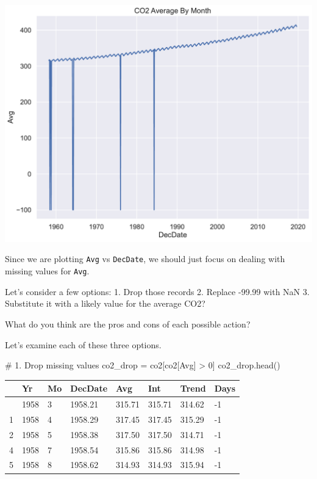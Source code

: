 \documentclass[
  letterpaper,
  DIV=11,
  numbers=noendperiod]{scrreprt}
\newenvironment{Shaded}{\begin{snugshade}}{\end{snugshade}}
\newcommand{\CommentTok}[1]{\textcolor[rgb]{0.37,0.37,0.37}{#1}}
\newcommand{\DecValTok}[1]{\textcolor[rgb]{0.68,0.00,0.00}{#1}}
\newcommand{\NormalTok}[1]{\textcolor[rgb]{0.00,0.23,0.31}{#1}}
\newcommand{\OperatorTok}[1]{\textcolor[rgb]{0.37,0.37,0.37}{#1}}
\newcommand{\StringTok}[1]{\textcolor[rgb]{0.13,0.47,0.30}{#1}}
\begin{document}
\includegraphics{eda/eda_files/figure-pdf/cell-71-output-1.pdf}

Since we are plotting \texttt{Avg} vs \texttt{DecDate}, we should just
focus on dealing with missing values for \texttt{Avg}.

Let's consider a few options: 1. Drop those records 2. Replace -99.99
with NaN 3. Substitute it with a likely value for the average CO2?

What do you think are the pros and cons of each possible action?

Let's examine each of these three options.

\begin{Shaded}
\begin{Highlighting}[]
\CommentTok{\# 1. Drop missing values}
\NormalTok{co2\_drop }\OperatorTok{=}\NormalTok{ co2[co2[}\StringTok{\textquotesingle{}Avg\textquotesingle{}}\NormalTok{] }\OperatorTok{\textgreater{}} \DecValTok{0}\NormalTok{]}
\NormalTok{co2\_drop.head()}
\end{Highlighting}
\end{Shaded}

\begin{longtable}[]{@{}llllllll@{}}
\toprule\noalign{}
& Yr & Mo & DecDate & Avg & Int & Trend & Days \\
\midrule\noalign{}
\endhead
\bottomrule\noalign{}
\endlastfoot
0 & 1958 & 3 & 1958.21 & 315.71 & 315.71 & 314.62 & -1 \\
1 & 1958 & 4 & 1958.29 & 317.45 & 317.45 & 315.29 & -1 \\
2 & 1958 & 5 & 1958.38 & 317.50 & 317.50 & 314.71 & -1 \\
4 & 1958 & 7 & 1958.54 & 315.86 & 315.86 & 314.98 & -1 \\
5 & 1958 & 8 & 1958.62 & 314.93 & 314.93 & 315.94 & -1 \\
\end{longtable}
\end{document}
